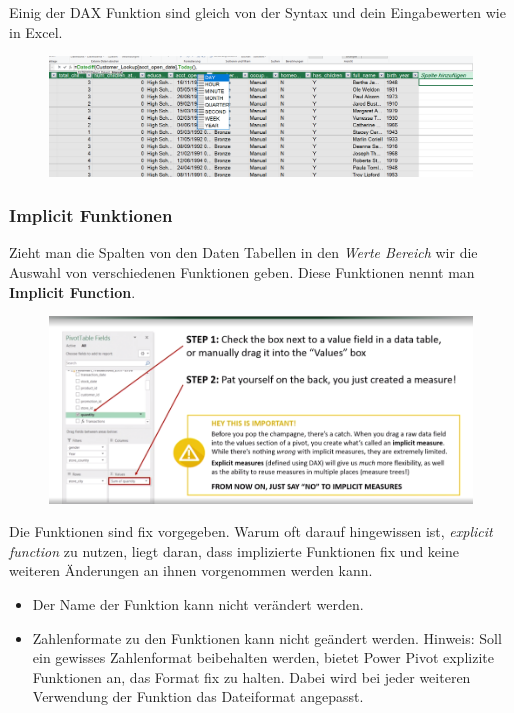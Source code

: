 Einig der \gls{DAX} Funktion sind gleich von der Syntax und dein Eingabewerten wie in Excel.
\begin{figure}[H]
	\centering
	\includegraphics[scale = 0.3]{attachment/chapter_1/screenshot080}
	\caption{}
	\label{fig:screenshot080}
\end{figure}
\subsubsection{Implicit Funktionen}
Zieht man die Spalten von den Daten Tabellen in den \textit{Werte Bereich} wir die Auswahl von verschiedenen Funktionen geben. Diese Funktionen nennt man \textbf{Implicit Function}.
\begin{figure}[H]
	\centering
	\includegraphics[scale = 0.3]{attachment/chapter_1/screenshot081}
	\caption{}
	\label{fig:screenshot081}
\end{figure}
Die Funktionen sind fix vorgegeben. Warum oft darauf hingewissen ist, \textit{explicit function} zu nutzen, liegt daran, dass implizierte Funktionen fix und keine weiteren Änderungen an ihnen vorgenommen werden kann. 
\begin{itemize}
\item Der Name der Funktion kann nicht verändert werden.  
\item Zahlenformate zu den Funktionen kann nicht geändert werden. Hinweis: Soll ein gewisses Zahlenformat beibehalten werden, bietet Power Pivot explizite Funktionen an, das Format fix zu halten. Dabei wird bei jeder weiteren Verwendung der Funktion das Dateiformat angepasst.
\end{itemize}

